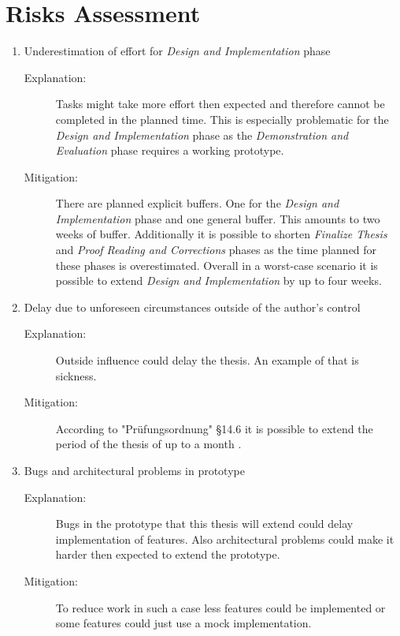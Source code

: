 \section{Risks Assessment}
\label{sec:Organisation:RiskAssessment}

\begin{enumerate}[label=Risk \arabic*:, align=left, leftmargin=*]
    \item Underestimation of effort for \emph{Design and Implementation} phase
        \begin{description}
            \item[Explanation:] Tasks might take more effort then expected and therefore cannot be completed in the planned time. This is especially problematic for the \emph{Design and Implementation} phase as the \emph{Demonstration and Evaluation} phase requires  a working prototype.
            \item[Mitigation:] There are planned explicit buffers. One for the \emph{Design and Implementation} phase and one general buffer. This amounts to two weeks of buffer. Additionally it is possible to shorten \emph{Finalize Thesis} and \emph{Proof Reading and Corrections} phases as the time planned for these phases is overestimated. Overall in a worst-case scenario it is possible to extend \emph{Design and Implementation} by up to four weeks.
        \end{description}
    \pagebreak[3]    
    \item Delay due to unforeseen circumstances outside of the author's control
        \begin{description}
            \item[Explanation:] Outside influence could delay the thesis. An example of that is sickness.
            \item[Mitigation:] According to "Prüfungsordnung" §14.6 it is possible to extend the period of the thesis of up to a month \cite[~ p. 724]{StudienUndPrufungsordnung2015}.
        \end{description}
    \pagebreak[3]
    \item Bugs and architectural problems in prototype
        \begin{description}
            \item[Explanation:] Bugs in the prototype that this thesis will extend could delay implementation of features. Also architectural problems could make it harder then expected to extend the prototype.
            \item[Mitigation:] To reduce work in such a case less features could be implemented or some features could just use a mock implementation.
        \end{description}
    \pagebreak[3]
\end{enumerate}
